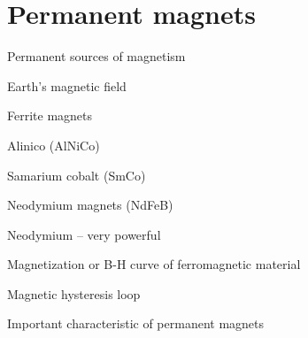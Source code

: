 \documentclass[compress]{beamer}
\begin{document}
\section{Permanent magnets}

{
    \begin{frame}{Permanent sources of magnetism}
    \end{frame}
}

{
    \begin{frame}{Earth's magnetic field}
    \end{frame}
}

{
    \begin{frame}{Ferrite magnets}
    \end{frame}
}

{
    \begin{frame}{Alinico (AlNiCo)}
    \end{frame}
}

{
    \begin{frame}{Samarium cobalt (SmCo)}
    \end{frame}
}

{
    \begin{frame}{Neodymium magnets (NdFeB)}
    \end{frame}
}

{
    \begin{frame}{Neodymium -- very powerful}
    \end{frame}
}

{
    \begin{frame}{Magnetization or B-H curve of ferromagnetic material}
    \end{frame}
}

{
    \begin{frame}{Magnetic hysteresis loop}
    \end{frame}
}

{
    \begin{frame}{Important characteristic of permanent magnets}
    \end{frame}
}
\end{document}

